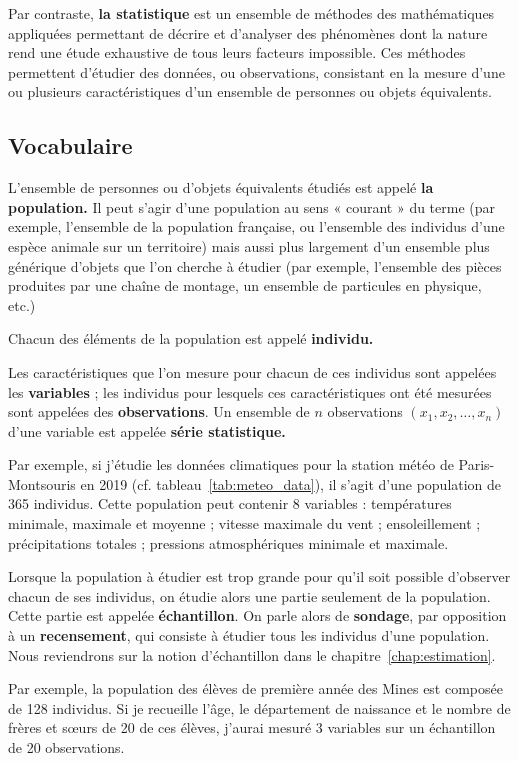 Par contraste, \textbf{la statistique} est un ensemble de méthodes des
mathématiques appliquées permettant de décrire et d'analyser des phénomènes
dont la nature rend une étude exhaustive de tous leurs facteurs impossible. Ces
méthodes permettent d'étudier des données, ou observations, consistant en la
mesure d'une ou plusieurs caractéristiques d'un ensemble de personnes ou objets
équivalents.

\subsection{Vocabulaire}

L'ensemble de personnes ou d'objets équivalents étudiés est appelé \textbf{la
  population.} Il peut s'agir d'une population au sens « courant » du terme
(par exemple, l'ensemble de la population française, ou l'ensemble des
individus d'une espèce animale sur un territoire) mais aussi plus largement
d'un ensemble plus générique d'objets que l'on cherche à étudier (par exemple,
l'ensemble des pièces produites par une chaîne de montage, un ensemble de
particules en physique, etc.)

Chacun des éléments de la population est appelé \textbf{individu.} 

Les caractéristiques que l'on mesure pour chacun de ces individus sont appelées
les \textbf{variables} ; les individus pour lesquels ces caractéristiques ont
été mesurées sont appelées des \textbf{observations}. Un ensemble de $n$
observations $(x_1, x_2, \dots, x_n)$ d'une variable est appelée \textbf{série
  statistique.}

Par exemple, si j'étudie les données climatiques pour la station météo de
Paris-Montsouris en 2019 (cf. tableau~\ref{tab:meteo_data}), il s'agit d'une
population de 365 individus. Cette population peut contenir 8 variables :
températures minimale, maximale et moyenne ; vitesse maximale du vent ;
ensoleillement ; précipitations totales ; pressions atmosphériques minimale et
maximale.


Lorsque la population à étudier est trop grande pour qu'il soit possible
d'observer chacun de ses individus, on étudie alors une partie seulement de la
population. Cette partie est appelée \textbf{échantillon}. On parle alors de
\textbf{sondage}, par opposition à un \textbf{recensement}, qui consiste à
étudier tous les individus d'une population. Nous reviendrons sur la notion
d'échantillon dans le chapitre~\ref{chap:estimation}.

Par exemple, la population des élèves de première année des Mines est
composée de 128 individus. Si je recueille l'âge, le département de naissance
et le nombre de frères et s\oe{}urs de 20 de ces élèves, j'aurai mesuré 3 variables
sur un échantillon de 20 observations. 

